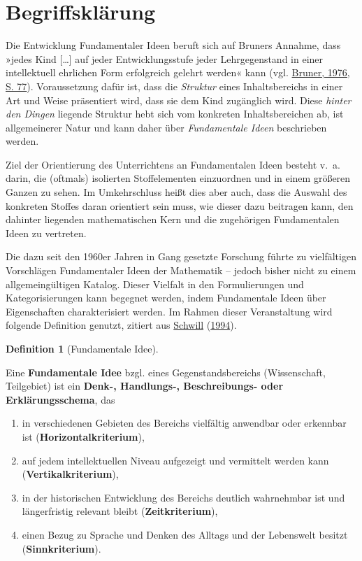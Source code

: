 \documentclass[
  ngerman,
]{scrbook}
\providecommand{\tightlist}{%
  \setlength{\itemsep}{0pt}\setlength{\parskip}{0pt}}
\theoremstyle{definition}
\newtheorem{definition}{Definition}[chapter]
\theoremstyle{definition}
\theoremstyle{definition}
\theoremstyle{definition}
\theoremstyle{remark}
\begin{document}
\hypertarget{fundamentale-ideen-begriffsklaerung}{%
\section{Begriffsklärung}\label{fundamentale-ideen-begriffsklaerung}}

Die Entwicklung Fundamentaler Ideen beruft sich auf Bruners Annahme, dass »jedes Kind {[}\ldots{]} auf jeder Entwicklungsstufe jeder Lehrgegenstand in einer intellektuell ehrlichen Form erfolgreich gelehrt werden« kann (vgl. \protect\hyperlink{ref-Bruner:1976}{Bruner, 1976, S. 77}). Voraussetzung dafür ist, dass die \emph{Struktur} eines Inhaltsbereichs in einer Art und Weise präsentiert wird, dass sie dem Kind zugänglich wird. Diese \emph{hinter den Dingen} liegende Struktur hebt sich vom konkreten Inhaltsbereichen ab, ist allgemeinerer Natur und kann daher über \emph{Fundamentale Ideen} beschrieben werden.

Ziel der Orientierung des Unterrichtens an Fundamentalen Ideen besteht v.~a. darin, die (oftmals) isolierten Stoffelementen einzuordnen und in einem größeren Ganzen zu sehen. Im Umkehrschluss heißt dies aber auch, dass die Auswahl des konkreten Stoffes daran orientiert sein muss, wie dieser dazu beitragen kann, den dahinter liegenden mathematischen Kern und die zugehörigen Fundamentalen Ideen zu vertreten.

Die dazu seit den 1960er Jahren in Gang gesetzte Forschung führte zu vielfältigen Vorschlägen Fundamentaler Ideen der Mathematik -- jedoch bisher nicht zu einem allgemeingültigen Katalog. Dieser Vielfalt in den Formulierungen und Kategorisierungen kann begegnet werden, indem Fundamentale Ideen über Eigenschaften charakterisiert werden. Im Rahmen dieser Veranstaltung wird folgende Definition genutzt, zitiert aus \protect\hyperlink{ref-Schwill:1994}{Schwill} (\protect\hyperlink{ref-Schwill:1994}{1994}).

\begin{definition}[Fundamentale Idee]
\protect\hypertarget{def:FundamentaleIdee}{}\label{def:FundamentaleIdee}

Eine \textbf{Fundamentale Idee} bzgl. eines Gegenstandsbereichs (Wissenschaft, Teilgebiet) ist ein \textbf{Denk-, Handlungs-, Beschreibungs- oder Erklärungsschema}, das

\begin{enumerate}
\def\labelenumi{\arabic{enumi}.}
\tightlist
\item
  in verschiedenen Gebieten des Bereichs vielfältig anwendbar oder erkennbar ist (\textbf{Horizontalkriterium}),
\item
  auf jedem intellektuellen Niveau aufgezeigt und vermittelt werden kann (\textbf{Vertikalkriterium}),
\item
  in der historischen Entwicklung des Bereichs deutlich wahrnehmbar ist und längerfristig relevant bleibt (\textbf{Zeitkriterium}),
\item
  einen Bezug zu Sprache und Denken des Alltags und der Lebenswelt besitzt (\textbf{Sinnkriterium}).
\end{enumerate}

\end{definition}
\end{document}
